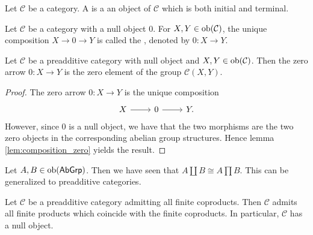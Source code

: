 \begin{definition}
	Let $\mathcal{C}$ be a category. A  is a an object of $\mathcal{C}$ which is both initial and terminal.
\end{definition}

\begin{definition}
	Let $\mathcal{C}$ be a category with a null object $0$. For $X,Y \in \operatorname{ob}(\mathcal{C})$, the unique composition $X \to 0 \to Y$ is called the , denoted by $0 : X \to Y$.
\end{definition}

\begin{lemma}
	\label{lem:zero_arrow}
	Let $\mathcal{C}$ be a preadditive category with null object and $X,Y \in \operatorname{ob}(\mathcal{C})$. Then the zero arrow $0 : X \to Y$ is the zero element of the group $\mathcal{C}(X,Y)$.
\end{lemma}

\begin{proof}
	The zero arrow $0 : X \to Y$ is the unique composition
	\begin{equation*}
		\begin{tikzcd}
			X \arrow[r] & 0 \arrow[r] & Y.
		\end{tikzcd}
	\end{equation*}
	However, since $0$ is a null object, we have that the two morphisms are the two zero objects in the corresponding abelian group structures. Hence lemma \ref{lem:composition_zero} yields the result.
\end{proof}

Let $A,B \in \operatorname{ob}(\mathsf{AbGrp})$. Then we have seen that $A \coprod B \cong A \prod B$. This can be generalized to preadditive categories.

\begin{proposition}
	\label{prop:products_and_coproducts_coincide}
	Let $\mathcal{C}$ be a preadditive category admitting all finite coproducts. Then $\mathcal{C}$ admits all finite products which coincide with the finite coproducts. In particular, $\mathcal{C}$ has a null object.
\end{proposition}


